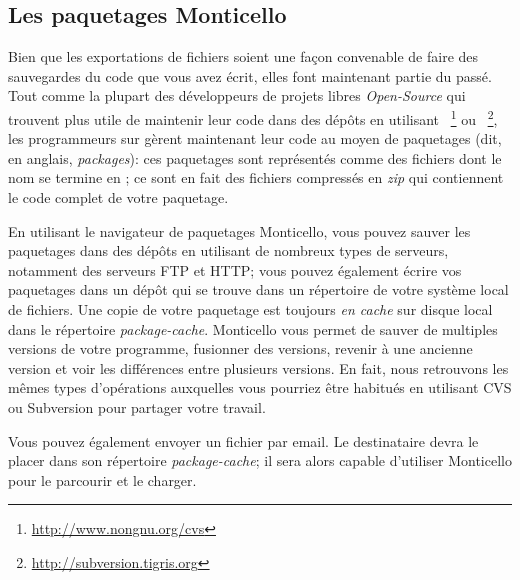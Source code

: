 \documentclass[a4paper,10pt,twoside]{book}
\begin{document}
\subsection{Les paquetages Monticello}
Bien que les exportations de fichiers soient une façon convenable de
faire des sauvegardes du code que vous avez écrit, elles font
maintenant partie du passé.
Tout comme la plupart des développeurs de projets libres
\emph{Open-Source} qui trouvent plus utile de maintenir leur code dans
des dépôts en utilisant ~\footnote{\url{http://www.nongnu.org/cvs}}
ou ~\footnote{\url{http://subversion.tigris.org}}, les
programmeurs sur \pharo gèrent maintenant leur code au moyen de
paquetages  (dit, en anglais, \emph{packages}): 
ces paquetages sont représentés comme des fichiers dont le nom se
termine en ; ce sont en fait des fichiers compressés en
\emph{zip} qui contiennent le code complet de votre paquetage.

En utilisant le navigateur de paquetages Monticello, vous pouvez sauver les paquetages dans des dépôts en utilisant de nombreux types de serveurs, notamment des serveurs FTP et HTTP; vous pouvez également écrire vos paquetages dans un dépôt qui se trouve dans un répertoire de votre système local de fichiers.
Une copie de votre paquetage est toujours \emph{en cache} sur disque local dans le répertoire \emph{package-cache}. 
Monticello vous permet de sauver de multiples versions de votre programme, fusionner des versions, revenir à une ancienne version et voir les différences entre plusieurs versions.
En fait, nous retrouvons les m\^emes types d'opérations auxquelles vous
pourriez \^etre habitués en utilisant CVS ou Subversion pour
partager votre travail.


Vous pouvez également envoyer un fichier  par email.
Le destinataire devra le placer dans son répertoire \emph{package-cache}; il sera alors capable d'utiliser Monticello pour le parcourir et le charger. 
\end{document}
